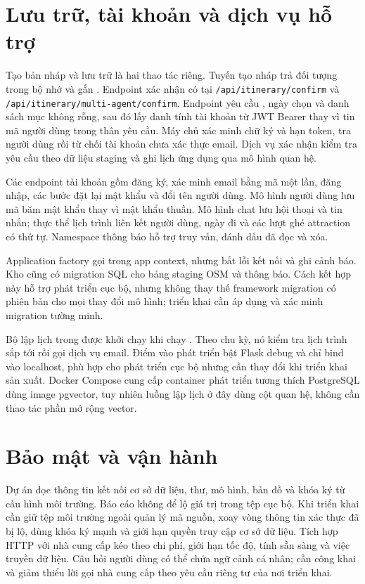 \section{Lưu trữ, tài khoản và dịch vụ hỗ trợ}

Tạo bản nháp và lưu trữ là hai thao tác riêng. Tuyến tạo nháp trả đối tượng trong bộ nhớ và gắn . Endpoint xác nhận có tại \nolinkurl{/api/itinerary/confirm} và \nolinkurl{/api/itinerary/multi-agent/confirm}. Endpoint yêu cầu , ngày chọn và danh sách mục không rỗng, sau đó lấy danh tính tài khoản từ JWT Bearer thay vì tin mã người dùng trong thân yêu cầu. Máy chủ xác minh chữ ký và hạn token, tra người dùng rồi từ chối tài khoản chưa xác thực email. Dịch vụ xác nhận kiểm tra yêu cầu theo dữ liệu staging và ghi lịch ứng dụng qua mô hình quan hệ.

Các endpoint tài khoản gồm đăng ký, xác minh email bằng mã một lần, đăng nhập, các bước đặt lại mật khẩu và đổi tên người dùng. Mô hình người dùng lưu mã băm mật khẩu thay vì mật khẩu thuần. Mô hình chat lưu hội thoại và tin nhắn; thực thể lịch trình liên kết người dùng, ngày đi và các lượt ghé attraction có thứ tự. Namespace thông báo hỗ trợ truy vấn, đánh dấu đã đọc và xóa.

Application factory gọi  trong app context, nhưng bắt lỗi kết nối và ghi cảnh báo. Kho cũng có migration SQL cho bảng staging OSM và thông báo. Cách kết hợp này hỗ trợ phát triển cục bộ, nhưng không thay thế framework migration có phiên bản cho mọi thay đổi mô hình; triển khai cần áp dụng và xác minh migration tường minh.

Bộ lập lịch trong  được khởi chạy khi chạy . Theo chu kỳ, nó kiểm tra lịch trình sắp tới rồi gọi dịch vụ email. Điểm vào phát triển bật Flask debug và chỉ bind vào localhost, phù hợp cho phát triển cục bộ nhưng cần thay đổi khi triển khai sản xuất. Docker Compose cung cấp container phát triển tương thích PostgreSQL dùng image pgvector, tuy nhiên luồng lập lịch ở đây dùng cột quan hệ, không cần thao tác phần mở rộng vector.

\section{Bảo mật và vận hành}

Dự án đọc thông tin kết nối cơ sở dữ liệu, thư, mô hình, bản đồ và khóa ký từ cấu hình môi trường. Báo cáo không để lộ giá trị trong tệp  cục bộ. Khi triển khai cần giữ tệp môi trường ngoài quản lý mã nguồn, xoay vòng thông tin xác thực đã bị lộ, dùng khóa ký mạnh và giới hạn quyền truy cập cơ sở dữ liệu. Tích hợp HTTP với nhà cung cấp kéo theo chi phí, giới hạn tốc độ, tính sẵn sàng và việc truyền dữ liệu. Câu hỏi người dùng có thể chứa ngữ cảnh cá nhân; cần công khai và giảm thiểu lời gọi nhà cung cấp theo yêu cầu riêng tư của nơi triển khai.

